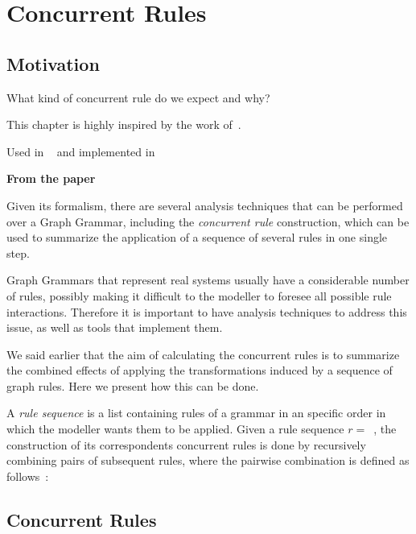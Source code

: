 \chapter{Concurrent Rules}

\section{Motivation}

What kind of concurrent rule do we expect and why?

This chapter is highly inspired by the work of~\cite{Lambers2010}. 

Used in ~\cite{BezerraWEIT2016} and implemented in ~\cite{BezerraETMF2016}

\textbf{From the paper}

Given its formalism, there are several analysis techniques that can be performed over a Graph Grammar, including the \emph{concurrent rule} construction, which can be used to summarize the application of a sequence of several rules in one single step.

Graph Grammars that represent real systems usually have a considerable number of rules, possibly making it difficult to the modeller to foresee all possible rule interactions. Therefore it is important to have analysis techniques to address this issue, as well as tools that implement them.

We said earlier that the aim of calculating the concurrent rules is to summarize the combined effects of applying the transformations induced by a sequence of graph rules. Here we present how this can be done.

A \emph{rule sequence} is a list containing rules of a grammar in an specific order in which the modeller wants them to be applied. Given a rule sequence \mbox{$r =$ }, the construction of its correspondents concurrent rules is done by recursively combining pairs of subsequent rules, where the pairwise combination is defined as follows~\cite{Ehrig2006,Lambers2010}:  

\section{Concurrent Rules}

\begin{definition}

\end{definition}

